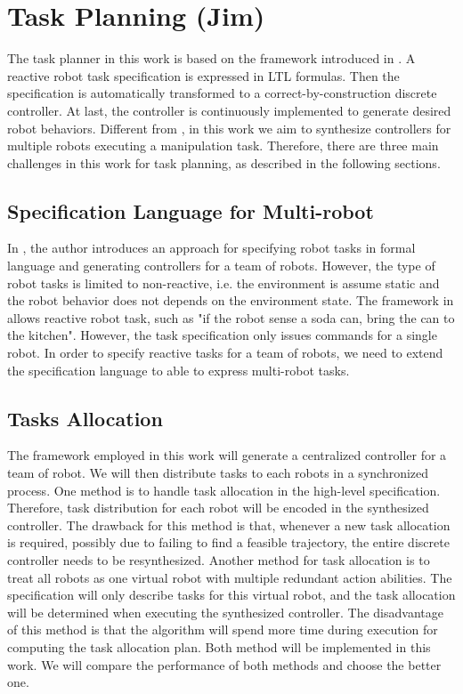 \section{Task Planning (Jim)}
The task planner in this work is based on the framework introduced in \cite{HKG2009}.
A reactive robot task specification is expressed in LTL formulas.
Then the specification is automatically transformed to a correct-by-construction discrete controller.
At last, the controller is continuously implemented to generate desired robot behaviors.
Different from \cite{HKG2009}, in this work we aim to synthesize controllers for multiple robots executing a manipulation task.
Therefore, there are three main challenges in this work for task planning, as described in the following sections.

\subsection{Specification Language for Multi-robot}
In \cite{ChenDSB12,Diaz-MercadoJBE15}, the author introduces an approach for specifying robot tasks in formal language and generating controllers for a team of robots. 
However, the type of robot tasks is limited to non-reactive, i.e. the environment is assume static and the robot behavior does not depends on the environment state.
The framework in \cite{HKG2009} allows reactive robot task, such as "if the robot sense a soda can, bring the can to the kitchen".
However, the task specification only issues commands for a single robot.
In order to specify reactive tasks for a team of robots, we need to extend the specification language to able to express  multi-robot tasks.

\subsection{Tasks Allocation}
The framework employed in this work will generate a centralized controller for a team of robot.
We will then distribute tasks to each robots in a synchronized process.
One method is to handle task allocation in the high-level specification.
Therefore, task distribution for each robot will be encoded in the synthesized controller.
The drawback for this method is that, whenever a new task allocation is required,
possibly due to failing to find a feasible trajectory, the entire discrete controller needs to be resynthesized.
Another method for task allocation is to treat all robots as one virtual robot with multiple redundant action abilities.
The specification will only describe tasks for this virtual robot,
and the task allocation will be determined when executing the synthesized controller.
The disadvantage of this method is that the algorithm will spend more time during execution for computing the task allocation plan.
Both method will be implemented in this work.
We will compare the performance of both methods and choose the better one.

